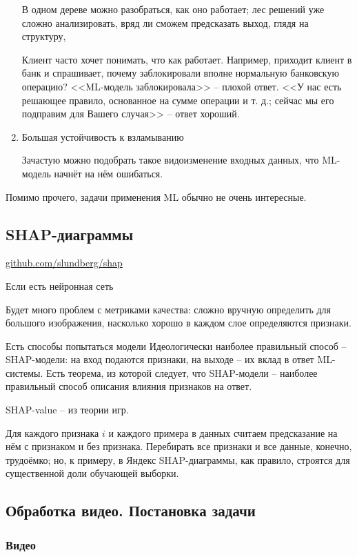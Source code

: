 \documentclass[main.tex]{subfiles}
\begin{document}
\begin{enumerate}[noitemsep]
    В одном дереве можно разобраться, как оно работает; лес решений уже сложно анализировать, вряд ли сможем предсказать выход, глядя на структуру,

    Клиент часто хочет понимать, что как работает.
    Например, приходит клиент в банк и спрашивает, почему заблокировали вполне нормальную банковскую операцию?
    <<ML-модель заблокировала>> -- плохой ответ.
    <<У нас есть решающее правило, основанное на сумме операции и т. д.; сейчас мы его подправим для Вашего случая>> -- ответ хороший.

    \item Большая устойчивость к взламыванию

    Зачастую можно подобрать такое видоизменение входных данных, что ML-модель начнёт на нём ошибаться.
\end{enumerate}

Помимо прочего, задачи применения ML обычно не очень интересные.

\subsection{SHAP-диаграммы}

\href{https://github.com/slundberg/shap}{github.com/slundberg/shap}

Если есть нейронная сеть %

Будет много проблем с метриками качества: сложно вручную определить для большого изображения, насколько хорошо в каждом слое определяются признаки.

Есть способы попытаться модели
Идеологически наиболее правильный способ -- SHAP-модели: на вход подаются признаки, на выходе -- их вклад в ответ ML-системы.
Есть теорема, из которой следует, что SHAP-модели -- наиболее правильный способ описания влияния признаков на ответ.

SHAP-value -- из теории игр.

Для каждого признака $ i $ и каждого примера в данных считаем предсказание на нём с признаком и без признака.
Перебирать все признаки и все данные, конечно, трудоёмко; но, к примеру, в Яндекс SHAP-диаграммы, как правило, строятся для существенной доли обучающей выборки.

\subsection{Обработка видео. Постановка задачи}

\subsubsection{Видео}
\end{document}
